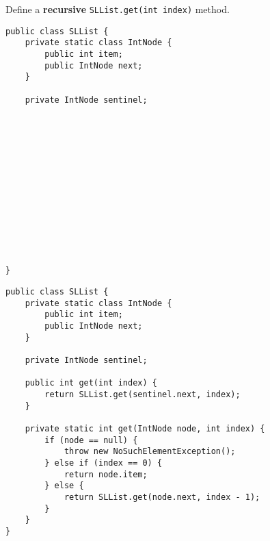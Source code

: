 \question Define a \textbf{recursive} \texttt{SLList.get(int index)} method.

\ifprintanswers\else
\begin{lstlisting}
public class SLList {
    private static class IntNode {
        public int item;
        public IntNode next;
    }

    private IntNode sentinel;














}
\end{lstlisting}
\fi

\begin{solution}
\begin{lstlisting}
public class SLList {
    private static class IntNode {
        public int item;
        public IntNode next;
    }

    private IntNode sentinel;

    public int get(int index) {
        return SLList.get(sentinel.next, index);
    }

    private static int get(IntNode node, int index) {
        if (node == null) {
            throw new NoSuchElementException();
        } else if (index == 0) {
            return node.item;
        } else {
            return SLList.get(node.next, index - 1);
        }
    }
}
\end{lstlisting}
\end{solution}